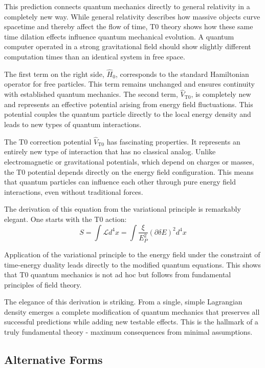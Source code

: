 \documentclass[12pt,a4paper]{article}
\newcommand{\deltaE}{\delta E}
\newcommand{\xipar}{\xi}
\newcommand{\EPlanck}{E_P}
\theoremstyle{definition}
\theoremstyle{remark}
\begin{document}
This prediction connects quantum mechanics directly to general relativity in a completely new way. While general relativity describes how massive objects curve spacetime and thereby affect the flow of time, T0 theory shows how these same time dilation effects influence quantum mechanical evolution. A quantum computer operated in a strong gravitational field should show slightly different computation times than an identical system in free space.

The first term on the right side, $\hat{H}_0$, corresponds to the standard Hamiltonian operator for free particles. This term remains unchanged and ensures continuity with established quantum mechanics. The second term, $\hat{V}_{\text{T0}}$, is completely new and represents an effective potential arising from energy field fluctuations. This potential couples the quantum particle directly to the local energy density and leads to new types of quantum interactions.

The T0 correction potential $\hat{V}_{\text{T0}}$ has fascinating properties. It represents an entirely new type of interaction that has no classical analog. Unlike electromagnetic or gravitational potentials, which depend on charges or masses, the T0 potential depends directly on the energy field configuration. This means that quantum particles can influence each other through pure energy field interactions, even without traditional forces.

The derivation of this equation from the variational principle is remarkably elegant. One starts with the T0 action:
$$S = \int \mathcal{L} d^4x = \int \frac{\xipar}{\EPlanck^2} (\partial \deltaE)^2 d^4x$$

Application of the variational principle to the energy field under the constraint of time-energy duality leads directly to the modified quantum equations. This shows that T0 quantum mechanics is not ad hoc but follows from fundamental principles of field theory.

The elegance of this derivation is striking. From a single, simple Lagrangian density emerges a complete modification of quantum mechanics that preserves all successful predictions while adding new testable effects. This is the hallmark of a truly fundamental theory - maximum consequences from minimal assumptions.

\subsection{Alternative Forms}
\end{document}
